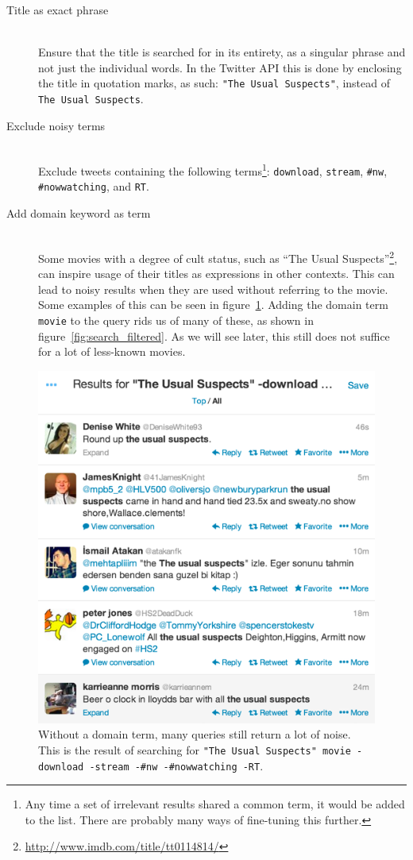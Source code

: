 \begin{description}
  \item[Title as exact phrase] \hfill \\
    Ensure that the title is searched for in its entirety, as a singular phrase and not just the individual words. In the Twitter API this is done by enclosing the title in quotation marks, as such: \texttt{"The Usual Suspects"}, instead of \verb|The Usual Suspects|.
  \item[Exclude noisy terms] \hfill \\
    Exclude tweets containing the following terms\footnote{Any time a set of irrelevant results shared a common term, it would be added to the list. There are probably many ways of fine-tuning this further.}: \texttt{download}, \texttt{stream}, \texttt{\#nw}, \texttt{\#nowwatching}, and \texttt{RT}.
  \item[Add domain keyword as term] \hfill \\
    Some movies with a degree of cult status, such as ``The Usual Suspects''\footnote{\url{http://www.imdb.com/title/tt0114814/}}, can inspire usage of their titles as expressions in other contexts. This can lead to noisy results when they are used without referring to the movie. Some examples of this can be seen in figure~\ref{fig:search_simple_filtered}. Adding the domain term \texttt{movie} to the query rids us of many of these, as shown in figure~\ref{fig:search_filtered}. As we will see later, this still does not suffice for a lot of less-known movies.
\end{description}

\begin{figure}[h]
  \centering
    \includegraphics{Figures/search_simple_filtered}
  \caption{Without a domain term, many queries still return a lot of noise. This is the result of searching for \texttt{"The Usual Suspects" movie -download -stream -\#nw -\#nowwatching -RT}.}
  \label{fig:search_simple_filtered}
\end{figure}

